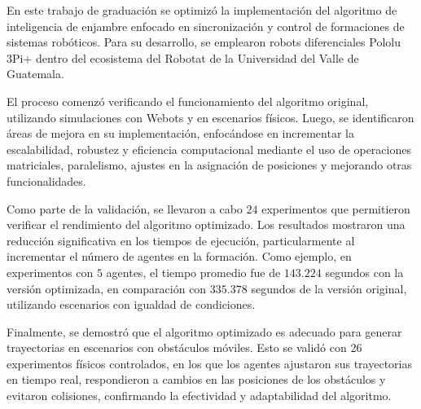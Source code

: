 En este trabajo de graduación se optimizó la implementación del algoritmo de inteligencia de enjambre enfocado en sincronización y control de formaciones de sistemas robóticos. Para su desarrollo, se emplearon robots diferenciales Pololu 3Pi+ dentro del ecosistema del Robotat de la Universidad del Valle de Guatemala.

El proceso comenzó verificando el funcionamiento del algoritmo original, utilizando simulaciones con Webots y en escenarios físicos. Luego, se identificaron áreas de mejora en su implementación, enfocándose en incrementar la escalabilidad, robustez y eficiencia computacional mediante el uso de operaciones matriciales, paralelismo, ajustes en la asignación de posiciones y mejorando otras funcionalidades.

Como parte de la validación, se llevaron a cabo $24$ experimentos que permitieron verificar el rendimiento del algoritmo optimizado. Los resultados mostraron una reducción significativa en los tiempos de ejecución, particularmente al incrementar el número de agentes en la formación. Como ejemplo, en experimentos con $5$ agentes, el tiempo promedio fue de $143.224$ segundos con la versión optimizada, en comparación con $335.378$ segundos de la versión original, utilizando escenarios con igualdad de condiciones.

Finalmente, se demostró que el algoritmo optimizado es adecuado para generar trayectorias en escenarios con obstáculos móviles. Esto se validó con $26$ experimentos físicos controlados, en los que los agentes ajustaron sus trayectorias en tiempo real, respondieron a cambios en las posiciones de los obstáculos y evitaron colisiones, confirmando la efectividad y adaptabilidad del algoritmo.

 
